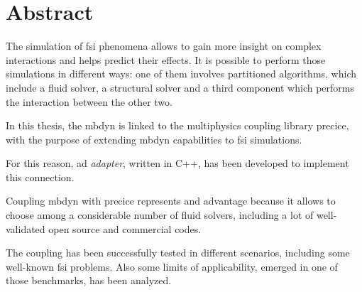 \chapter*{Abstract}
\label{cha:abstract}


The simulation of \acrfull{fsi} phenomena allows to gain more insight on complex interactions and helps predict their effects. It is possible to perform those simulations in different ways: one of them involves partitioned algorithms, which include a fluid solver, a structural solver and a third component which performs the interaction between the other two.

In this thesis, the \acrfull{mbdyn} is linked to the multiphysics coupling library \acrfull{precice}, with the purpose of extending \acrshort{mbdyn} capabilities to \acrshort{fsi} simulations.

For this reason, ad \textit{adapter}, written in C++, has been developed to implement this connection.

Coupling \acrshort{mbdyn} with \acrshort{precice} represents and advantage because it allows to choose among a considerable number of fluid solvers, including a lot of well-validated open source and commercial codes.

The coupling has been successfully tested in different scenarios, including some well-known \acrshort{fsi} problems. Also some limits of applicability, emerged in one of those benchmarks, has been analyzed.


\vspace{5mm}


